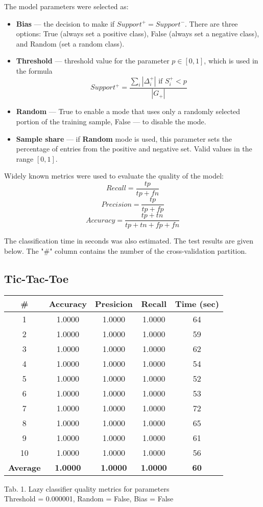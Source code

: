 \documentclass{article}
\begin{document}
The model parameters were selected as:
\begin{itemize}
    \item \textbf{Bias} --- the decision to make if $Support^+ = Support^ -$. There are three options: True (always set a positive class), False (always set a negative class), and Random (set a random class).
    \item \textbf{Threshold} --- threshold value for the parameter $p \in [0, 1]$, which is used in the formula
    $$Support^+ = \frac{\sum_i |\Delta_i^+| \text{ if } S_i^+<p}{|G_+|}$$
    \item \textbf{Random} --- True to enable a mode that uses only a randomly selected portion of the training sample, False --- to disable the mode.
    \item \textbf{Sample share} --- if \textbf{Random} mode is used, this parameter sets the percentage of entries from the positive and negative set. Valid values in the range $[0, 1]$.
\end{itemize}
Widely known metrics were used to evaluate the quality of the model:
$$Recall = \frac{tp}{tp+fn}$$
$$Precision = \frac{tp}{tp+fp}$$
$$Accuracy = \frac{tp + tn}{tp + tn + fp + fn}$$

The classification time in seconds was also estimated. The test results are given below. The "\#" column contains the number of the cross-validation partition.

\subsection{Tic-Tac-Toe}

\begin{center}
    \begin{tabular}{|c|c|c|c|c|}
        \hline
        \# & \textbf{Accuracy} & \textbf{Presicion} & \textbf{Recall} & \textbf{Time (sec)}  \\
        \hline
        1 & 1.0000 & 1.0000 & 1.0000 & 64 \\
        2 & 1.0000 & 1.0000 & 1.0000 & 59 \\
        3 & 1.0000 & 1.0000 & 1.0000 & 62 \\
        4 & 1.0000 & 1.0000 & 1.0000 & 54 \\
        5 & 1.0000 & 1.0000 & 1.0000 & 52 \\
        6 & 1.0000 & 1.0000 & 1.0000 & 53 \\
        7 & 1.0000 & 1.0000 & 1.0000 & 72 \\
        8 & 1.0000 & 1.0000 & 1.0000 & 65 \\
        9 & 1.0000 & 1.0000 & 1.0000 & 61 \\
        10 & 1.0000 & 1.0000 & 1.0000 & 56 \\
        \hline
        \textbf{Average} & \textbf{1.0000} & \textbf{1.0000} & \textbf{1.0000} & \textbf{60} \\
        \hline
    \end{tabular}
    
    Tab. 1. Lazy classifier quality metrics for parameters \\Threshold = 0.000001, Random = False, Bias = False
\end{center}
\end{document}

